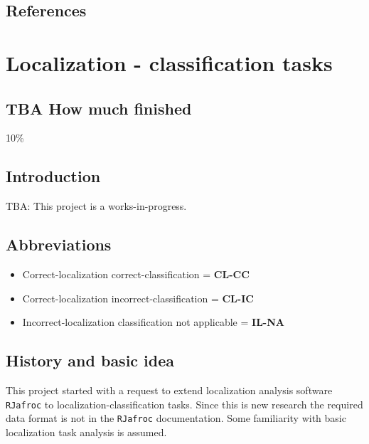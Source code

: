 \documentclass[
]{book}
\providecommand{\tightlist}{%
  \setlength{\itemsep}{0pt}\setlength{\parskip}{0pt}}
\begin{document}
\hypertarget{optim-op-point-references}{%
\section{References}\label{optim-op-point-references}}

\hypertarget{classification-tasks}{%
\chapter{Localization - classification tasks}\label{classification-tasks}}

\hypertarget{classification-tasks-how-much-finished}{%
\section{TBA How much finished}\label{classification-tasks-how-much-finished}}

10\%

\hypertarget{classification-tasks-intro}{%
\section{Introduction}\label{classification-tasks-intro}}

TBA: This project is a works-in-progress.

\hypertarget{classification-tasks-abbreviations}{%
\section{Abbreviations}\label{classification-tasks-abbreviations}}

\begin{itemize}
\tightlist
\item
  Correct-localization correct-classification = \textbf{CL-CC}
\item
  Correct-localization incorrect-classification = \textbf{CL-IC}
\item
  Incorrect-localization classification not applicable = \textbf{IL-NA}
\end{itemize}

\hypertarget{classification-tasks-basic-idea}{%
\section{History and basic idea}\label{classification-tasks-basic-idea}}

This project started with a request to extend localization analysis software \texttt{RJafroc} to localization-classification tasks. Since this is new research the required data format is not in the \texttt{RJafroc} documentation. Some familiarity with basic localization task analysis is assumed.
\end{document}
